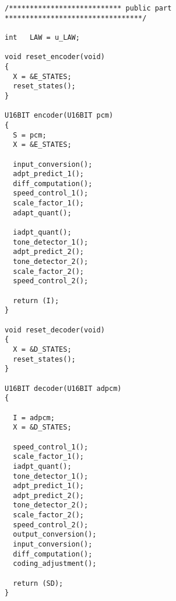 \begin{verbatim}
/*************************** public part *********************************/

int   LAW = u_LAW;

void reset_encoder(void)
{
  X = &E_STATES;
  reset_states();
}

U16BIT encoder(U16BIT pcm)
{
  S = pcm;
  X = &E_STATES;

  input_conversion();
  adpt_predict_1();
  diff_computation();
  speed_control_1();
  scale_factor_1();
  adapt_quant();
 
  iadpt_quant();
  tone_detector_1();
  adpt_predict_2();
  tone_detector_2();
  scale_factor_2();
  speed_control_2();

  return (I);
}

void reset_decoder(void)
{
  X = &D_STATES;
  reset_states();
}

U16BIT decoder(U16BIT adpcm)
{

  I = adpcm;
  X = &D_STATES;

  speed_control_1();
  scale_factor_1();
  iadpt_quant();
  tone_detector_1();
  adpt_predict_1();
  adpt_predict_2();
  tone_detector_2();
  scale_factor_2();
  speed_control_2();
  output_conversion();
  input_conversion();
  diff_computation();
  coding_adjustment();

  return (SD);
}
\end{verbatim}
